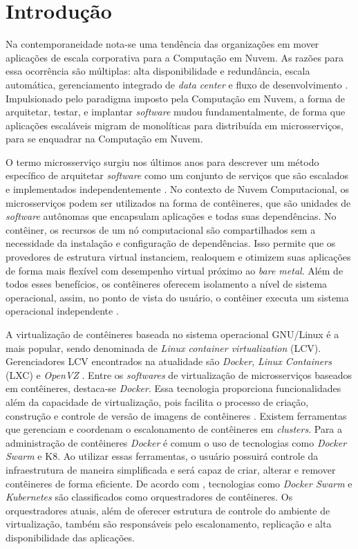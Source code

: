 \chapter{Introdução}
Na contemporaneidade nota-se uma tendência das organizações em mover aplicações de escala corporativa para a Computação em Nuvem. As razões para essa ocorrência são múltiplas: alta disponibilidade e redundância, escala automática, gerenciamento integrado de \textit{data center} e fluxo de desenvolvimento \cite{Fritzsch}. Impulsionado pelo paradigma imposto pela Computação em Nuvem, a forma de arquitetar, testar, e implantar \textit{software} mudou fundamentalmente, de forma que aplicações escaláveis migram de monolíticas para distribuída em microsserviços, para se enquadrar na Computação em Nuvem.

O termo microsserviço surgiu nos últimos anos para descrever um método específico de arquitetar \textit{software} como um conjunto de serviços que são escalados e implementados independentemente \cite{FowlerMicrosservice}. No contexto de Nuvem Computacional, os microsserviços podem ser utilizados na forma de contêineres, que são unidades de \textit{software} autônomas que encapsulam aplicações e todas suas dependências. No contêiner, os recursos de um nó computacional são compartilhados sem a necessidade da instalação e configuração de dependências. Isso permite que os provedores de estrutura virtual instanciem, realoquem e otimizem suas aplicações de forma mais flexível com desempenho virtual próximo ao \textit{bare metal}. Além de todos esses benefícios, os contêineres oferecem isolamento a nível de sistema operacional, assim, no ponto de vista do usuário, o contêiner executa um sistema operacional independente \cite{Fazio2016, Assuno}. 

A virtualização de contêineres baseada no sistema operacional GNU/Linux é a mais popular, sendo denominada de \textit{Linux container virtualization} (LCV). Gerenciadores LCV encontrados na atualidade são \textit{Docker}, \textit{Linux Containers} (LXC) e \textit{OpenVZ} \cite{Fazio2016}. Entre os \textit{softwares} de virtualização de microsserviços baseados em contêineres, destaca-se \textit{Docker}. Essa tecnologia proporciona funcionalidades além da capacidade de virtualização, pois facilita o processo de criação, construção e controle de versão de imagens de contêineres \cite{Redhat}.
%
Existem ferramentas que gerenciam e coordenam o escalonamento de contêineres em \textit{clusters}. Para a administração de contêineres \textit{Docker} é comum o uso de tecnologias como \textit{Docker Swarm} e \ac{K8}. Ao utilizar essas ferramentas, o usuário possuirá controle da infraestrutura de maneira simplificada e será capaz de criar, alterar e remover contêineres de forma eficiente. De acordo com , tecnologias como \textit{Docker Swarm} e \textit{Kubernetes} são classificados como orquestradores de contêineres. Os orquestradores atuais, além de oferecer estrutura de controle do ambiente de virtualização, também são responsáveis pelo escalonamento, replicação e alta disponibilidade das aplicações. 

